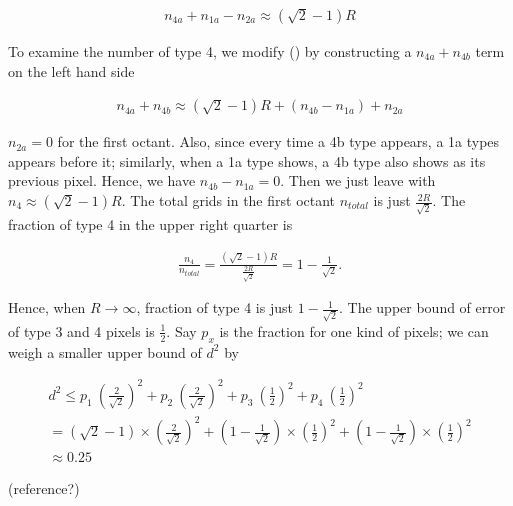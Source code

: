 \documentclass[letterpaper]{article}
\numberwithin{equation}{section} %
\numberwithin{figure}{section} %
\numberwithin{table}{section} %
\begin{document}
\begin{align} 
n_{4a}+n_{1a}-n_{2a} \approx (\sqrt{2}-1)R
\end{align}

\noindent
To examine the number of type 4, we modify () by constructing a $n_{4a}+n_{4b}$ term on the left hand side

\begin{align} 
n_{4a}+n_{4b} \approx (\sqrt{2}-1)R+(n_{4b}-n_{1a})+n_{2a}
\end{align}

\noindent
$n_{2a}=0$ for the first octant. Also, since every time a 4b type appears, a 1a types appears before it; similarly, when a 1a type shows, a 4b type also shows as its previous pixel. Hence, we have $n_{4b}-n_{1a}=0$. Then we just leave with $n_{4} \approx (\sqrt{2}-1)R$. The total grids in the first octant $n_{total}$ is just $\frac{2R}{\sqrt{2}}$. The fraction of type 4 in the upper right quarter is

\begin{align} 
\frac{n_{4}}{n_{total}} = \frac{(\sqrt{2}-1)R}{\frac{2R}{\sqrt{2}}} = 1-\frac{1}{\sqrt{2}}.
\end{align}

\noindent
Hence, when $R \rightarrow \infty$, fraction of type 4 is just $1-\frac{1}{\sqrt{2}}$. The upper bound of error of type 3 and 4 pixels is $\frac{1}{2}$. Say $p_x$ is the fraction for one kind of pixels; we can weigh a smaller upper bound of $d^2$ by 

\begin{align} 
d^2 \leq p_1 \ (\frac{2}{\sqrt{2}})^2 + p_2 \ (\frac{2}{\sqrt{2}})^2 + p_3 \ (\frac{1}{2})^2 + p_4 \ (\frac{1}{2})^2 \\
= (\sqrt{2}-1) \times (\frac{2}{\sqrt{2}})^2 + (1-\frac{1}{\sqrt{2}}) \times (\frac{1}{2})^2 + (1-\frac{1}{\sqrt{2}}) \times (\frac{1}{2})^2 \\
\approx 0.25
\end{align}

(reference?)
\end{document}
